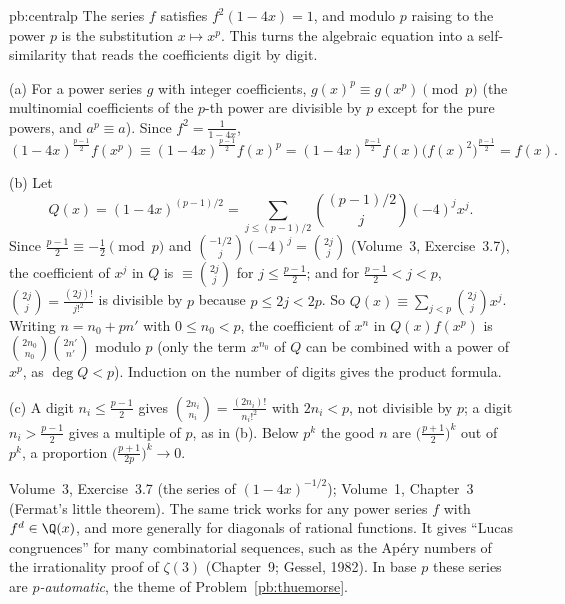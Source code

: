 \begin{solution}{pb:centralp}
\idea The series $f$ satisfies $f^2(1-4x)=1$, and modulo $p$ raising to the power $p$ is the substitution $x\mapsto x^p$. This turns
the algebraic equation into a self-similarity that reads the coefficients digit by digit.

\writeup (a) For a power series $g$ with integer coefficients, $g(x)^p\equiv g(x^p)\pmod p$ (the multinomial coefficients of the
$p$-th power are divisible by $p$ except for the pure powers, and $a^p\equiv a$). Since $f^2=\frac1{1-4x}$,
\[
(1-4x)^{\frac{p-1}2}f(x^p)\equiv(1-4x)^{\frac{p-1}2}f(x)^p=(1-4x)^{\frac{p-1}2}f(x)\bigl(f(x)^2\bigr)^{\frac{p-1}2}=f(x).
\]

(b) Let
\[
Q(x)=(1-4x)^{(p-1)/2}=\sum_{j\le(p-1)/2}\binom{(p-1)/2}j(-4)^jx^j.
\]
Since $\frac{p-1}2\equiv-\frac12\pmod p$ and
$\binom{-1/2}j(-4)^j=\binom{2j}j$ (Volume~3, Exercise~3.7), the coefficient of $x^j$ in $Q$ is $\equiv\binom{2j}j$ for $j\le\frac{p-1}2$; and for
$\frac{p-1}2<j<p$, $\binom{2j}j=\frac{(2j)!}{j!^2}$ is divisible by $p$ because $p\le2j<2p$. So $Q(x)\equiv\sum_{j<p}\binom{2j}jx^j$. Writing
$n=n_0+pn'$ with $0\le n_0<p$, the coefficient of $x^n$ in $Q(x)f(x^p)$ is $\binom{2n_0}{n_0}\binom{2n'}{n'}$ modulo $p$ (only the term
$x^{n_0}$ of $Q$ can be combined with a power of $x^p$, as $\deg Q<p$). Induction on the number of digits gives the product
formula.

(c) A digit $n_i\le\frac{p-1}2$ gives $\binom{2n_i}{n_i}=\frac{(2n_i)!}{n_i!^2}$ with $2n_i<p$, not divisible by $p$; a digit $n_i>\frac{p-1}2$ gives a
multiple of $p$, as in (b). Below $p^k$ the good $n$ are $\bigl(\frac{p+1}2\bigr)^k$ out of $p^k$, a proportion
$\bigl(\frac{p+1}{2p}\bigr)^k\to0$.

\tools Volume~3, Exercise~3.7 (the series of $(1-4x)^{-1/2}$); Volume~1, Chapter~3 (Fermat's little theorem).
\leads The same trick works for any power series $f$ with $f^d\in\Q(x)$, and more generally for diagonals of rational functions.
It gives ``Lucas congruences'' for many combinatorial sequences, such as the Apéry numbers of the irrationality proof of $\zeta(3)$
(Chapter~9; Gessel, 1982). In base $p$
these series are \emph{$p$-automatic}, the theme of Problem~\ref{pb:thuemorse}.
\end{solution}

